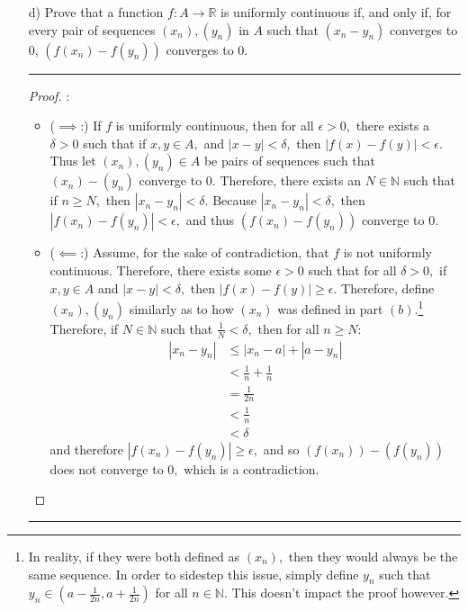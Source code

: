 \documentclass[openany, amssymb, psamsfonts]{amsart}
\newcommand{\bbN}{\mathbb{N}}
\newcommand{\bbR}{\mathbb{R}}
\theoremstyle{definition}
\numberwithin{equation}{section}
\begin{document}
\begin{enumerate}
\begin{enumerate}
\item[d)] Prove that a function $f\colon A\longrightarrow \bbR$ is uniformly continuous if, and only if, for every pair of sequences $(x_n),(y_n)$ in $A$ such that $(x_n-y_n)$ converges to 0,  $(f(x_n)-f(y_n))$ converges to 0.
\vspace{4pt}     \hrule   \vspace{4pt} \begin{proof}:\\
    \begin{itemize}
        \item ($\implies$:) If $f$ is uniformly continuous, then for all $\epsilon>0,$ there exists a $\delta>0$ such that if $x,y \in A,$ and $|x-y|< \delta,$ then $|f(x) - f(y)|< \epsilon.$ Thus let $(x_n), (y_n) \in A$ be pairs of sequences such that $(x_n) - (y_n)$ converge to $0.$ Therefore, there exists an $N\in \bbN$ such that if $n\geq N,$ then $|x_n - y_n|< \delta.$ Because $|x_n - y_n|< \delta,$ then $|f(x_n) - f(y_n)|< \epsilon,$ and thus $(f(x_n) - f(y_n))$ converge to $0.$
        \item ($\impliedby$:) Assume, for the sake of contradiction, that $f$ is not uniformly continuous. Therefore, there exists some $\epsilon>0$ such that for all $\delta>0,$ if $x,y \in A$ and $|x-y|< \delta,$ then $|f(x) - f(y)|\geq \epsilon.$ Therefore, define $(x_n), (y_n)$ similarly as to how $(x_n)$ was defined in part $(b).$\footnote{In reality, if they were both defined as $(x_n),$ then they would always be the same sequence. In order to sidestep this issue, simply define $y_n$ such that $y_n \in (a-\frac{1}{2n}, a+ \frac{1}{2n})$ for all $n\in \bbN.$ This doesn't impact the proof however.} Therefore, if $N\in \bbN$ such that $\frac{1}{N}< \delta,$ then for all $n\geq N:$
        \begin{align*}
            |x_n - y_n|&\leq |x_n - a| + |a - y_n|\\
            &< \frac{1}{n} + \frac{1}{n}\\
            &= \frac{1}{2n}\\
            &< \frac{1}{n}\\
            &< \delta
        \end{align*}
        and therefore $|f(x_n) - f(y_n)|\geq \epsilon,$ and so $(f(x_n)) - (f(y_n))$ does not converge to $0,$ which is a contradiction.
    \end{itemize}
\end{proof}\vspace{4pt}     \hrule   \vspace{4pt} 
\end{enumerate}


\end{enumerate}
\end{document}
